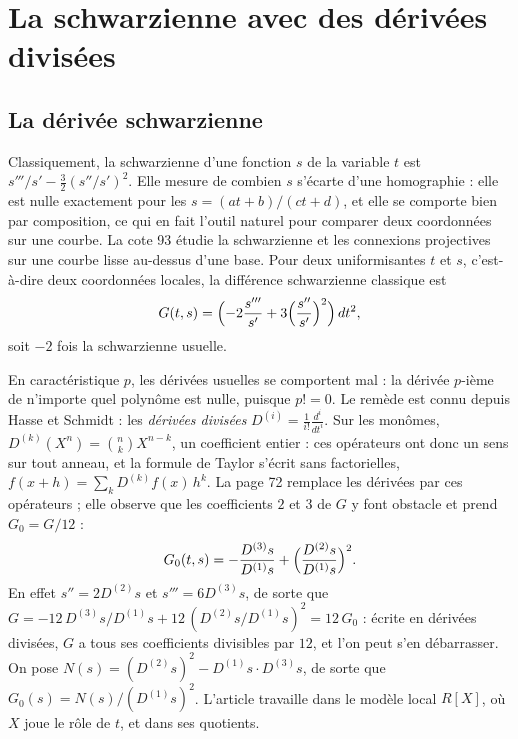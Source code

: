 \documentclass[11pt,a4paper]{amsart}
\theoremstyle{definition}
\theoremstyle{plain}
\theoremstyle{remark}
\theoremstyle{plain}
\begin{document}
\section{La schwarzienne avec des dérivées divisées}

\subsection{La dérivée schwarzienne}

Classiquement, la schwarzienne d'une fonction $s$ de la variable $t$ est $s'''/s' - \frac32(s''/s')^2$. Elle mesure de combien $s$ s'écarte d'une homographie : elle est nulle exactement pour les $s = (at + b)/(ct + d)$, et elle se comporte bien par composition, ce qui en fait l'outil naturel pour comparer deux coordonnées sur une courbe. La cote 93 étudie la schwarzienne et les connexions projectives sur une courbe lisse au-dessus d'une base. Pour deux uniformisantes $t$ et $s$, c'est-à-dire deux coordonnées locales, la différence schwarzienne classique est
\[
G(t, s) = \Bigl(-2\frac{s'''}{s'} + 3\Bigl(\frac{s''}{s'}\Bigr)^2\Bigr)\,dt^2,
\]
soit $-2$ fois la schwarzienne usuelle.

En caractéristique $p$, les dérivées usuelles se comportent mal : la dérivée $p$-ième de n'importe quel polynôme est nulle, puisque $p! = 0$. Le remède est connu depuis Hasse et Schmidt : les \emph{dérivées divisées} $D^{(i)} = \frac{1}{i!}\frac{d^i}{dt^i}$. Sur les monômes, $D^{(k)}(X^n) = \binom nk X^{n-k}$, un coefficient entier : ces opérateurs ont donc un sens sur tout anneau, et la formule de Taylor s'écrit sans factorielles, $f(x + h) = \sum_k D^{(k)}f(x)\,h^k$. La page 72 remplace les dérivées par ces opérateurs ; elle observe que les coefficients $2$ et $3$ de $G$ y font obstacle et prend $G_0 = G/12$ :
\[
G_0(t, s) = -\frac{D^{(3)}s}{D^{(1)}s} + \Bigl(\frac{D^{(2)}s}{D^{(1)}s}\Bigr)^2.
\]
En effet $s'' = 2D^{(2)}s$ et $s''' = 6D^{(3)}s$, de sorte que $G = -12\,D^{(3)}s/D^{(1)}s + 12\,(D^{(2)}s/D^{(1)}s)^2 = 12\,G_0$ : écrite en dérivées divisées, $G$ a tous ses coefficients divisibles par $12$, et l'on peut s'en débarrasser. On pose $N(s) = (D^{(2)}s)^2 - D^{(1)}s\cdot D^{(3)}s$, de sorte que $G_0(s) = N(s)/(D^{(1)}s)^2$. L'article travaille dans le modèle local $R[X]$, où $X$ joue le rôle de $t$, et dans ses quotients.
\end{document}
